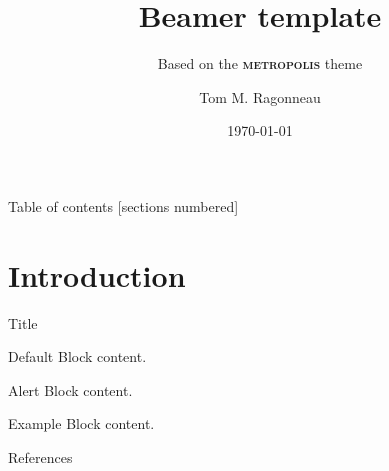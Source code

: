 \documentclass{beamer}
\title{Beamer template}
\subtitle{Based on the \textbf{\textsc{metropolis}} theme}
\date{\today}
\author{Tom M. Ragonneau}
\institute{%
    Department of Applied Mathematics,
    The Hong Kong Polytechnic University
}
\begin{document}
\maketitle

\begin{frame}{Table of contents}
    [sections numbered]
    \tableofcontents[hideallsubsections]
\end{frame}

\section{Introduction}

\begin{frame}[fragile]{Title}
    \nocite{*}
    \begin{block}{Default}
        Block content.
    \end{block}

    \begin{alertblock}{Alert}
        Block content.
    \end{alertblock}

    \begin{exampleblock}{Example}
        Block content.
    \end{exampleblock}
\end{frame}

\appendix

\begin{frame}{References}
    \printbibliography[heading=none]
\end{frame}
\end{document}
